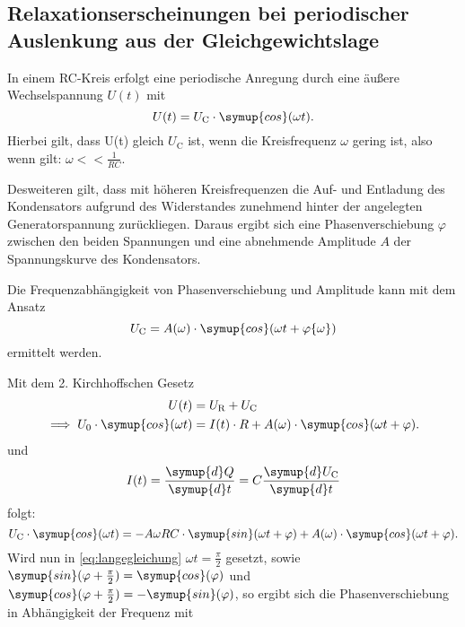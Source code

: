

\subsection{Relaxationserscheinungen bei periodischer Auslenkung aus der Gleichgewichtslage}

In einem RC-Kreis erfolgt eine periodische Anregung durch eine äußere Wechselspannung $U(t)$ mit
\begin{equation}
U(t) = U_{\text{C}}\cdot \symup{cos}(\omega t).
\end{equation}
Hierbei gilt, dass U(t) gleich $U_{\text{C}}$ ist, wenn die Kreisfrequenz $\omega$ gering ist, also wenn gilt: $\omega << \frac{1}{RC}$.

Desweiteren gilt, dass mit höheren Kreisfrequenzen die Auf- und Entladung des Kondensators aufgrund des Widerstandes zunehmend hinter der angelegten Generatorspannung zurückliegen. Daraus ergibt sich eine Phasenverschiebung 
$\varphi$ zwischen den beiden Spannungen und eine abnehmende Amplitude $A$ der Spannungskurve des Kondensators.

Die Frequenzabhängigkeit von Phasenverschiebung und Amplitude kann mit dem Ansatz
\begin{equation}
U_{\text{C}} = A(\omega)\cdot \symup{cos}(\omega t + \varphi \{\omega\})
\end{equation}
ermittelt werden. 

Mit dem 2. Kirchhoffschen Gesetz
\begin{equation}
\begin{aligned}
U(t) &= U_{\text{R}} + U_{\text{C}} \\
\implies U_0 \cdot \symup{cos}(\omega t) &= I(t)\cdot R + A(\omega)\cdot \symup{cos}(\omega t + \varphi).
\end{aligned}
\end{equation}
und 
\begin{equation}
I(t) = \frac{\symup{d}Q}{\symup{d}t} = C \frac{\symup{d}U_{\text{C}}}{\symup{d}t}
\label{eq:strom2}
\end{equation}
folgt:
\begin{equation}
U_{\text{C}}\cdot \symup{cos}(\omega t) = -A\omega RC\cdot \symup{sin}(\omega t + \varphi) + A(\omega)\cdot \symup{cos}(\omega t + \varphi).
\label{eq:langegleichung}
\end{equation}
Wird nun in \eqref{eq:langegleichung} $\omega t = \frac{\pi}{2}$ gesetzt, sowie $\symup{sin}(\varphi + \frac{\pi}{2}) = \symup{cos}(\varphi)$ und $\symup{cos}(\varphi + \frac{\pi}{2}) = -\symup{sin}(\varphi)$,
so ergibt sich die Phasenverschiebung in Abhängigkeit der Frequenz mit

